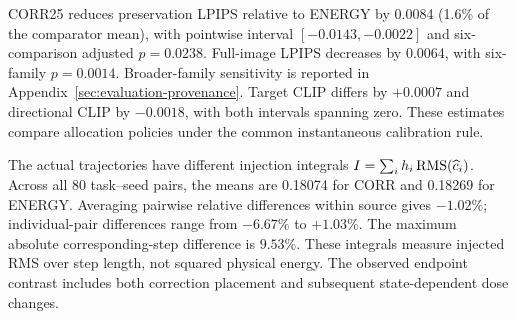 CORR25 reduces preservation LPIPS relative to ENERGY by 0.0084 (1.6\% of the comparator mean), with pointwise interval $[-0.0143,-0.0022]$ and six-comparison adjusted $p=0.0238$. Full-image LPIPS decreases by 0.0064, with six-family $p=0.0014$. Broader-family sensitivity is reported in Appendix~\ref{sec:evaluation-provenance}. Target CLIP differs by $+0.0007$ and directional CLIP by $-0.0018$, with both intervals spanning zero. These estimates compare allocation policies under the common instantaneous calibration rule.

The actual trajectories have different injection integrals $I=\sum_i h_i\operatorname{RMS}(\widehat c_i)$. Across all 80 task--seed pairs, the means are 0.18074 for CORR and 0.18269 for ENERGY. Averaging pairwise relative differences within source gives $-1.02\%$; individual-pair differences range from $-6.67\%$ to $+1.03\%$. The maximum absolute corresponding-step difference is $9.53\%$. These integrals measure injected RMS over step length, not squared physical energy. The observed endpoint contrast includes both correction placement and subsequent state-dependent dose changes.

